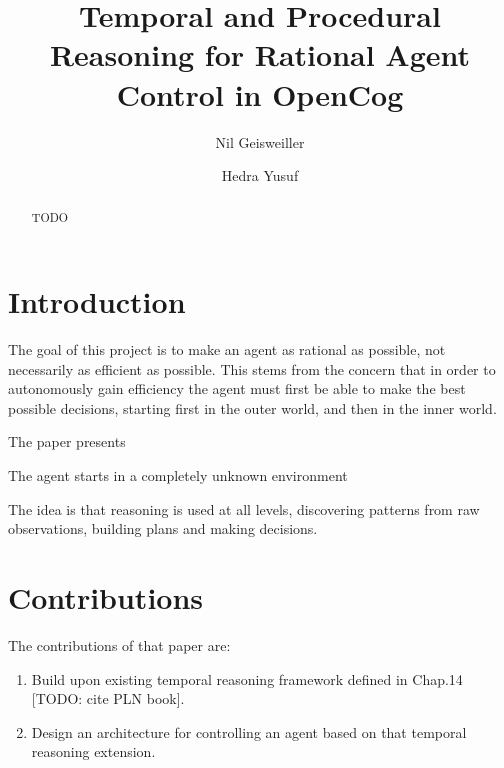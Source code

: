 \documentclass[runningheads]{llncs}
\begin{document}
%
\title{Temporal and Procedural Reasoning for Rational Agent Control in
  OpenCog}

%
\author{Nil Geisweiller
  \and Hedra Yusuf}
%
%
%
\maketitle              %
%

\begin{abstract}
  TODO

\end{abstract}

\section{Introduction}

The goal of this project is to make an agent as rational as possible,
not necessarily as efficient as possible.  This stems from the concern
that in order to autonomously gain efficiency the agent must first be
able to make the best possible decisions, starting first in the outer
world, and then in the inner world.

The paper presents

The agent starts in a completely unknown environment

The idea is that reasoning is used at all levels, discovering patterns
from raw observations, building plans and making decisions.

\section{Contributions}

The contributions of that paper are:
\begin{enumerate}
\item Build upon existing temporal reasoning framework defined in
  Chap.14 [TODO: cite PLN book].
\item Design an architecture for controlling an agent based on that
  temporal reasoning extension.
\end{enumerate}
\end{document}
